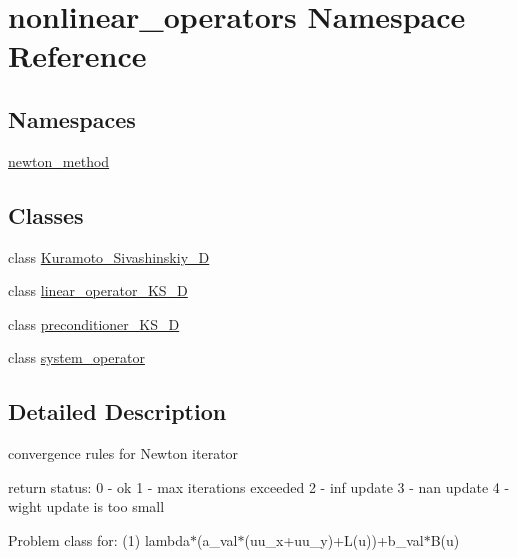 \hypertarget{namespacenonlinear__operators}{\section{nonlinear\-\_\-operators Namespace Reference}
\label{namespacenonlinear__operators}
}
\subsection*{Namespaces}
\begin{DoxyCompactItemize}
\item 
\hyperlink{namespacenonlinear__operators_1_1newton__method}{newton\-\_\-method}
\end{DoxyCompactItemize}
\subsection*{Classes}
\begin{DoxyCompactItemize}
\item 
class \hyperlink{classnonlinear__operators_1_1Kuramoto__Sivashinskiy__2D}{Kuramoto\-\_\-\-Sivashinskiy\-\_\-D}
\item 
class \hyperlink{classnonlinear__operators_1_1linear__operator__KS__2D}{linear\-\_\-operator\-\_\-\-K\-S\-\_\-D}
\item 
class \hyperlink{classnonlinear__operators_1_1preconditioner__KS__2D}{preconditioner\-\_\-\-K\-S\-\_\-D}
\item 
class \hyperlink{classnonlinear__operators_1_1system__operator}{system\-\_\-operator}
\end{DoxyCompactItemize}


\subsection{Detailed Description}
convergence rules for Newton iterator

return status\-: 0 -\/ ok 1 -\/ max iterations exceeded 2 -\/ inf update 3 -\/ nan update 4 -\/ wight update is too small

Problem class for\-: (1) lambda$\ast$(a\-\_\-val$\ast$(uu\-\_\-x+uu\-\_\-y)+\-L(u))+b\-\_\-val$\ast$\-B(u)

